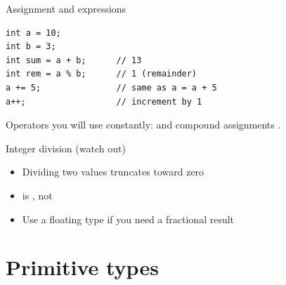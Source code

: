\documentclass[aspectratio=169,11pt]{beamer}
\begin{document}
    \begin{frame}[fragile]{Assignment and expressions}
        \begin{lstlisting}
int a = 10;
int b = 3;
int sum = a + b;      // 13
int rem = a % b;      // 1 (remainder)
a += 5;               // same as a = a + 5
a++;                  // increment by 1
        \end{lstlisting}
        \vspace{0.3em}
        Operators you will use constantly: \javacode{+} \javacode{-} \javacode{*} \javacode{/} \javacode{\%}
        and compound assignments \javacode{+=} \javacode{-=} \javacode{*=} \javacode{/=}.
    \end{frame}

    \begin{frame}{Integer division (watch out)}
        \begin{itemize}
            \item Dividing two  values truncates toward zero
            \item {} is , not 
            \item Use a floating type if you need a fractional result
        \end{itemize}
        \vspace{0.4em}
    \end{frame}

    \section{Primitive types}
\end{document}
